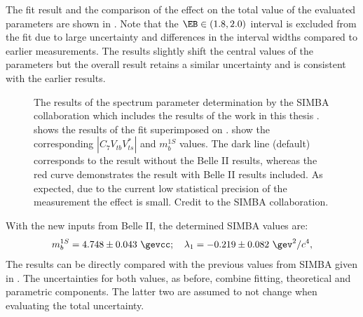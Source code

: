 The fit result and the comparison of the effect on the total value of the evaluated parameters are shown in .
Note that the $\EB\in(1.8,2.0)$ interval is excluded from the fit due to large uncertainty and differences in the interval widths compared to earlier \BtoXsgamma measurements.
The results slightly shift the central values of the parameters but the overall result retains a similar uncertainty and is consistent with the earlier results.
\begin{figure}[htbp!]
    \centering
    \caption{\label{fig:simba_c7}
    The results of the \BtoXsgamma spectrum parameter determination by the SIMBA collaboration which includes the results of the work in this thesis
    \cite{Bernlochner:2020jlt}.
     shows the results of the fit superimposed on .
     show the corresponding $|C_7V_{tb}V^*_{ts}|$ and $m_b^{1S}$ values.
    The dark line (default) corresponds to the result without the Belle II results, whereas the red curve demonstrates the result with Belle II results included.
    As expected, due to the current low statistical precision of the \BtoXsgamma measurement the effect is small.
    Credit to the SIMBA collaboration.
    }
\end{figure}


With the new inputs from Belle II, the determined SIMBA values are:
\begin{equation}\label{eq:new_simba_values}
    m_b^{1S}= 4.748\pm0.043~\gevcc; \quad \lambda_1 = -0.219\pm0.082~\gev^2/c^4,
\end{equation}
The results can be directly compared with the previous values from SIMBA given in .
The uncertainties for both values, as before, combine fitting, theoretical and parametric components.
The latter two are assumed to not change when evaluating the total uncertainty.

